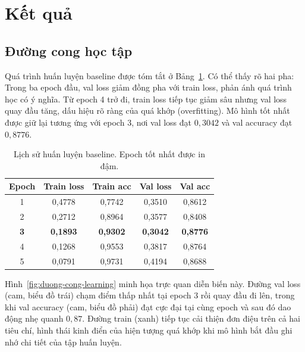 \section{Kết quả}

\subsection{Đường cong học tập}

Quá trình huấn luyện baseline được tóm tắt ở Bảng~\ref{tab:lich-su-huan-luyen}. Có thể thấy rõ hai pha: Trong ba epoch đầu, val loss giảm đồng pha với train loss, phản ánh quá trình học có ý nghĩa. Từ epoch 4 trở đi, train loss tiếp tục giảm sâu nhưng val loss quay đầu tăng, dấu hiệu rõ ràng của quá khớp (overfitting). Mô hình tốt nhất được giữ lại tương ứng với epoch 3, nơi val loss đạt $0,3042$ và val accuracy đạt $0,8776$.

\begin{table}[htbp]
\centering
\caption{Lịch sử huấn luyện baseline. Epoch tốt nhất được in đậm.}
\label{tab:lich-su-huan-luyen}
\begin{tabular}{ccccc}
\hline
\textbf{Epoch} & \textbf{Train loss} & \textbf{Train acc} & \textbf{Val loss} & \textbf{Val acc} \\ \hline
1              & 0,4778              & 0,7742             & 0,3510            & 0,8612           \\
2              & 0,2712              & 0,8964             & 0,3577            & 0,8408           \\
\textbf{3}     & \textbf{0,1893}     & \textbf{0,9302}    & \textbf{0,3042}   & \textbf{0,8776}  \\
4              & 0,1268              & 0,9553             & 0,3817            & 0,8764           \\
5              & 0,0791              & 0,9731             & 0,4194            & 0,8688           \\ \hline
\end{tabular}
\end{table}

Hình~\ref{fig:duong-cong-learning} minh họa trực quan diễn biến này. Đường val loss (cam, biểu đồ trái) chạm điểm thấp nhất tại epoch 3 rồi quay đầu đi lên, trong khi val accuracy (cam, biểu đồ phải) đạt cực đại tại cùng epoch và sau đó dao động nhẹ quanh $0,87$. Đường train (xanh) tiếp tục cải thiện đơn điệu trên cả hai tiêu chí, hình thái kinh điển của hiện tượng quá khớp khi mô hình bắt đầu ghi nhớ chi tiết của tập huấn luyện.

